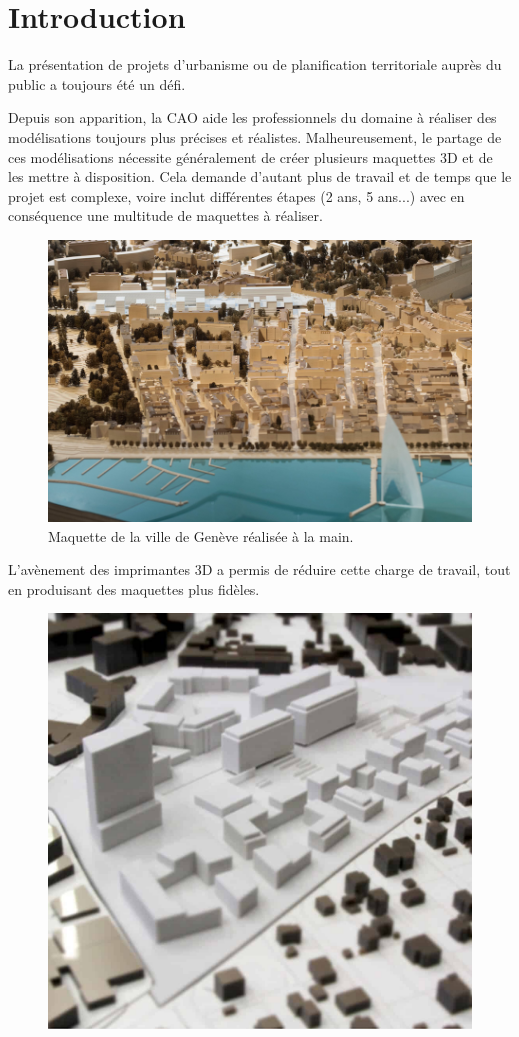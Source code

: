 \chapter{Introduction}

\label{Chapter1} %

La présentation de projets d'urbanisme ou de planification territoriale auprès du public a toujours été un défi. 

Depuis son apparition, la CAO aide les professionnels du domaine à réaliser des modélisations toujours plus précises et réalistes. 
Malheureusement, le partage de ces modélisations nécessite généralement de créer plusieurs maquettes 3D et de les mettre à disposition. Cela demande d'autant plus de travail et de temps que le projet est complexe, voire inclut différentes étapes (2 ans, 5 ans...) avec en conséquence une multitude de maquettes à réaliser.

\begin{figure}[h]
    \centering
    \includegraphics[width=0.8\linewidth]{Figures/geneva-model.png}
    \caption{Maquette de la ville de Genève réalisée à la main.}
    \label{fig:geneva-model}
\end{figure}

L'avènement des imprimantes 3D a permis de réduire cette charge de travail, tout en produisant des maquettes plus fidèles. 


\begin{figure}[h]
    \centering
    \includegraphics[width=0.5\linewidth]{Figures/3d-printed-model.jpg}
    \label{fig:3d-printed-model}
\end{figure}

